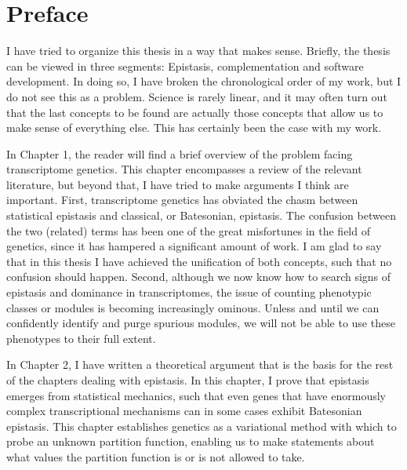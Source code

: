 \documentclass[12pt]{caltech_thesis}
\begin{document}
\begin{publishedcontent}[iknowwhattodo]

\nocite{Angeles-Albores2018a, Angeles-Albores2018b,
        Angeles-Albores2017, Angeles-Albores2016}
\nocite{Angeles2018micro}
\end{publishedcontent}

\tableofcontents
\listoffigures
\listoftables

\mainmatter{}

\chapter*{Preface}

I have tried to organize this thesis in a way that makes sense. Briefly, the
thesis can be viewed in three segments: Epistasis, complementation and software
development. In doing so, I have broken the chronological order of my work, but
I do not see this as a problem. Science is rarely linear, and it may often turn
out that the last concepts to be found are actually those concepts that allow us
to make sense of everything else. This has certainly been the case with my work.

In Chapter 1, the reader will find a brief overview of the problem facing
transcriptome genetics. This chapter encompasses a review of the relevant
literature, but beyond that, I have tried to make arguments I think are
important. First, transcriptome genetics has obviated the chasm between
statistical epistasis and classical, or Batesonian, epistasis. The confusion
between the two (related) terms has been one of the great misfortunes in the
field of genetics, since it has hampered a significant amount of work. I am glad
to say that in this thesis I have achieved the unification of both concepts,
such that no confusion should happen. Second, although we now know how to search
signs of epistasis and dominance in transcriptomes, the issue of counting
phenotypic classes or modules is becoming increasingly ominous. Unless and until
we can confidently identify and purge spurious modules, we will not be able to
use these phenotypes to their full extent.

In Chapter 2, I have written a theoretical argument that is the basis for the
rest of the chapters dealing with epistasis. In this chapter, I prove that
epistasis emerges from statistical mechanics, such that even genes that have
enormously complex transcriptional mechanisms can in some cases exhibit
Batesonian epistasis. This chapter establishes genetics as a variational method
with which to probe an unknown partition function, enabling us to make
statements about what values the partition function is or is not allowed to
take.
\end{document}
